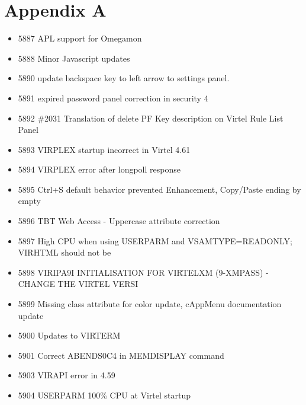 \documentclass[letterpaper,10pt,english]{sphinxmanual}
\begin{document}
\chapter{Appendix A}
\label{\detokenize{TN202101:appendix-a}}
\begin{itemize}
\item {} 
5887 APL support for Omegamon

\item {} 
5888 Minor Javascript updates

\item {} 
5890 update backspace key to left arrow to settings panel.

\item {} 
5891 expired password panel correction in security 4

\item {} 
5892 \#2031 Translation of delete PF Key description on Virtel Rule List Panel

\item {} 
5893 VIRPLEX startup incorrect in Virtel 4.61

\item {} 
5894 VIRPLEX error after longpoll response

\item {} 
5895 Ctrl+S default behavior prevented Enhancement, Copy/Paste ending by empty

\item {} 
5896 TBT Web Access - Uppercase attribute correction

\item {} 
5897 High CPU when using USERPARM and VSAMTYPE=READONLY; VIRHTML should not be

\item {} 
5898 VIRIPA9I INITIALISATION FOR VIRTELXM (9-XMPASS) - CHANGE THE VIRTEL VERSI

\item {} 
5899 Missing class attribute for color update, cAppMenu documentation update

\item {} 
5900 Updates to VIRTERM

\item {} 
5901 Correct ABENDS0C4 in MEMDISPLAY command

\item {} 
5903 VIRAPI error in 4.59

\item {} 
5904 USERPARM 100\% CPU at Virtel startup


\end{itemize}
\end{document}
